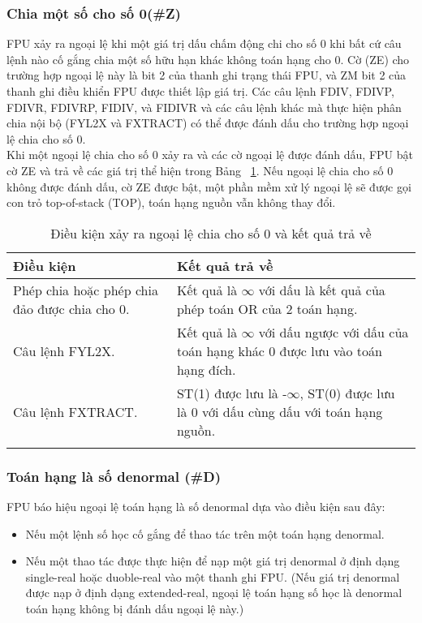 	\subsubsection*{Chia một số cho số 0(\#Z)}
		FPU xảy ra ngoại lệ khi một giá trị dấu chấm động chi cho số 0 khi bất cứ câu lệnh nào cố gắng chia một số hữu hạn khác không toán hạng cho 0. Cờ (ZE) cho trường hợp ngoại lệ này là bit 2 của thanh ghi trạng thái FPU, và ZM  bit 2 của thanh ghi điều khiển FPU được thiết lập giá trị. Các câu lệnh FDIV, FDIVP, FDIVR, FDIVRP, FIDIV, và FIDIVR và các câu lệnh khác mà thực hiện phân chia nội bộ (FYL2X và FXTRACT) có thể được đánh dấu cho trường hợp ngoại lệ chia cho số 0. \\
		
		Khi một ngoại lệ chia cho số 0 xảy ra và các cờ ngoại lệ được đánh dấu, FPU bật cờ ZE và trả về các giá trị thể hiện trong Bảng ~\ref{tb:ChiaCho0}. Nếu ngoại lệ chia cho số 0 không được đánh dấu, cờ ZE được bật, một phần mềm xử lý ngoại lệ sẽ được gọi con trỏ top-of-stack (TOP), toán hạng nguồn vẫn không thay đổi.
		\begin{longtable}{|m{6cm}|m{8cm}|}
				\hline
					Điều kiện & Kết quả trả về \\
				\hline
				\hline
					Phép chia hoặc phép chia đảo được chia cho 0. & Kết quả là $\mathbb{\infty}$ với dấu là kết quả của phép toán OR của 2 toán hạng. \\
				\hline
					Câu lệnh FYL2X. &  Kết quả là $\mathbb{\infty}$ với dấu ngược với dấu của toán hạng khác 0 được lưu vào toán hạng đích. \\
				\hline
					Câu lệnh FXTRACT. & ST(1) được lưu là -$\mathbb{\infty}$, ST(0) được lưu là 0 với dấu cùng dấu với toán hạng nguồn.\\
				\hline
					\caption{Điều kiện xảy ra ngoại lệ chia cho số 0 và kết quả trả về}					
					\label{tb:ChiaCho0}
		\end{longtable}		
		
		\subsubsection*{Toán hạng là số denormal (\#D)}
		FPU báo hiệu ngoại lệ toán hạng là số denormal dựa vào điều kiện sau đây:
			\begin{itemize}
			\renewcommand{\labelitemi}{\textbullet}
			\item Nếu một lệnh số học cố gắng để thao tác trên một toán hạng denormal.
			\item  Nếu một thao tác được thực hiện để nạp một giá trị denormal ở định dạng single-real hoặc duoble-real vào một thanh ghi FPU. (Nếu giá trị denormal được nạp ở định dạng extended-real, ngoại lệ toán hạng số học là denormal toán hạng không bị đánh dấu ngoại lệ này.)
			\end{itemize}
 	
